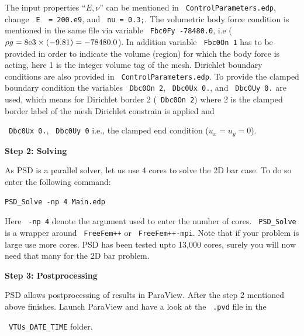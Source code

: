 The input properties ``$E,\nu$'' can be mentioned in \lstinline[style=Linux]! ControlParameters.edp!, change \lstinline[style=Linux]! E  = 200.e9!, and \lstinline[style=Linux]! nu = 0.3;!. The volumetric body force condition is mentioned in the same file via variable \lstinline[style=Linux]! Fbc0Fy -78480.0!, i.e ($\rho g=8\text e3\times (-9.81)=-78480.0$). In addition variable \lstinline[style=Linux]! Fbc0On 1! has to be provided in order to indicate the volume (region) for which the body force is acting, here 1 is the integer volume tag of the mesh. Dirichlet boundary conditions are also provided in \lstinline[style=Linux]! ControlParameters.edp!. To provide the clamped boundary condition the variables   \lstinline[style=Linux]! Dbc0On 2!, \lstinline[style=Linux]! Dbc0Ux 0.!, and \lstinline[style=Linux]! Dbc0Uy 0.!  are used, which means for Dirichlet border 2 (\lstinline[style=Linux]! Dbc0On 2!) where 2 is the clamped border label of the mesh  Dirichlet constrain is applied and {\lstinline[style=Linux]! Dbc0Ux 0.!, {\lstinline[style=Linux]! Dbc0Uy 0!} i.e., the clamped end condition ($u_x=u_y=0$).

\textbf{Step 2: Solving}

As PSD is a parallel solver, let us use  4 cores to solve the 2D bar case. To do so enter the following command:

\begin{lstlisting}[style=BashInputStyle]
PSD_Solve -np 4 Main.edp
\end{lstlisting}

Here \lstinline[style=Linux]! -np 4! denote the argument used to enter the number of cores. \lstinline[style=Linux]! PSD_Solve! is a wrapper around \lstinline[style=Linux]! FreeFem++! or \lstinline[style=Linux]! FreeFem++-mpi!.  Note that if your problem is large use more cores. PSD has been tested upto 13,000 cores, surely you will now need that many for the 2D bar problem. 

\textbf{Step 3: Postprocessing}

PSD allows postprocessing of results in ParaView. After the step 2 mentioned above finishes. Launch ParaView and have a look at the  \lstinline[style=Linux]! .pvd! file in the  {\lstinline[style=Linux]! VTUs_DATE_TIME! folder. 

}}
